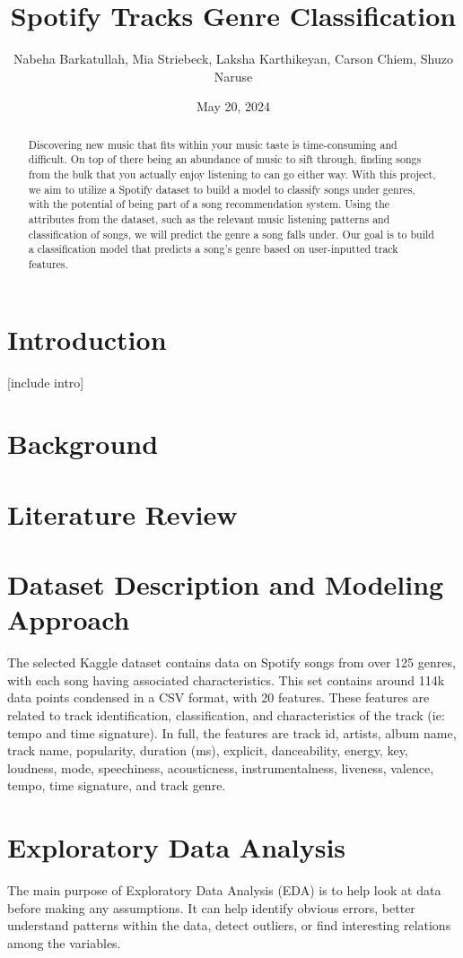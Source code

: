 \documentclass[times, twocolumn]{article}
\title{Spotify Tracks Genre Classification}
\author{Nabeha Barkatullah, Mia Striebeck, Laksha Karthikeyan, Carson Chiem, Shuzo Naruse}
\date{May 20, 2024}
\begin{document}
\maketitle

\newpage
\begin{abstract}
Discovering new music that fits within your music taste is time-consuming and difficult. On top of there being an abundance of music to sift through, finding songs from the bulk that you actually enjoy listening to can go either way. With this project, we aim to utilize a Spotify dataset to build a model to classify songs under genres, with the potential of being part of a song recommendation system. Using the attributes from the dataset, such as the relevant music listening patterns and classification of songs, we will predict the genre a song falls under. Our goal is to build a classification model that predicts a song’s genre based on user-inputted track features.
\end{abstract}
\section{Introduction}
[include intro]
\section{Background}
\section{Literature Review}

\section{Dataset Description and Modeling Approach}
The selected Kaggle dataset contains data on Spotify songs from over 125 genres, with each song having associated characteristics. This set contains around 114k data points condensed in a CSV format, with 20 features. These features are related to track identification, classification, and characteristics of the track (ie: tempo and time signature). In full, the features are track id, artists, album name, track name, popularity, duration (ms), explicit, danceability, energy, key, loudness, mode, speechiness, acousticness, instrumentalness, liveness, valence, tempo, time signature, and track genre.

\section{Exploratory Data Analysis}
The main purpose of Exploratory Data Analysis (EDA) is to help look at data before making any assumptions. It can help identify obvious errors, better understand patterns within the data, detect outliers, or find interesting relations among the variables.
\end{document}
